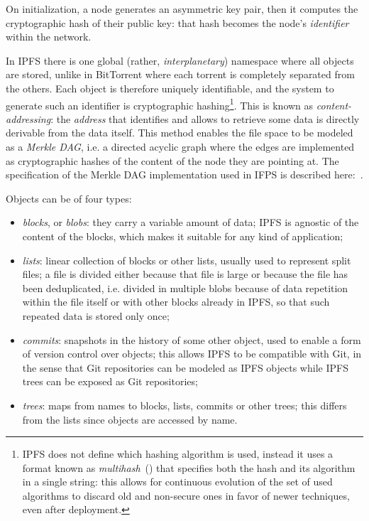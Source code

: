 \documentclass[mscthesis]{usiinfthesis}
\begin{document}
On initialization, a node generates an asymmetric key pair, then it computes the cryptographic hash of their public key: that hash becomes the node's \emph{identifier} within the network.

In IPFS there is one global (rather, \textit{interplanetary}) namespace where all objects are stored, unlike in BitTorrent where each torrent is completely separated from the others. Each object is therefore uniquely identifiable, and the system to generate such an identifier is cryptographic hashing\footnote{IPFS does not define which hashing algorithm is used, instead it uses a format known as \emph{multihash}~(\cite{multihash}) that specifies both the hash and its algorithm in a single string: this allows for continuous evolution of the set of used algorithms to discard old and non-secure ones in favor of newer techniques, even after deployment.}. This is known as \emph{content-addressing}: the \textit{address} that identifies and allows to retrieve some data is directly derivable from the data itself. This method enables the file space to be modeled as a \textit{Merkle DAG}, i.e. a directed acyclic graph where the edges are implemented as cryptographic hashes of the content of the node they are pointing at. The specification of the Merkle DAG implementation used in IFPS is described here:~\cite{website:ipfsmerkledag}.

Objects can be of four types:
\begin{itemize}
	\item \emph{blocks}, or \textit{blobs}: they carry a variable amount of data; IPFS is agnostic of the content of the blocks, which makes it suitable for any kind of application;
	\item \emph{lists}: linear collection of blocks or other lists, usually used to represent split files; a file is divided either because that file is large or because the file has been deduplicated, i.e. divided in multiple blobs because of data repetition within the file itself or with other blocks already in IPFS, so that such repeated data is stored only once;
	\item \emph{commits}: snapshots in the history of some other object, used to enable a form of version control over objects; this allows IPFS to be compatible with Git, in the sense that Git repositories can be modeled as IPFS objects while IPFS trees can be exposed as Git repositories;
	\item \emph{trees}: maps from names to blocks, lists, commits or other trees; this differs from the lists since objects are accessed by name.
\end{itemize}
\end{document}
